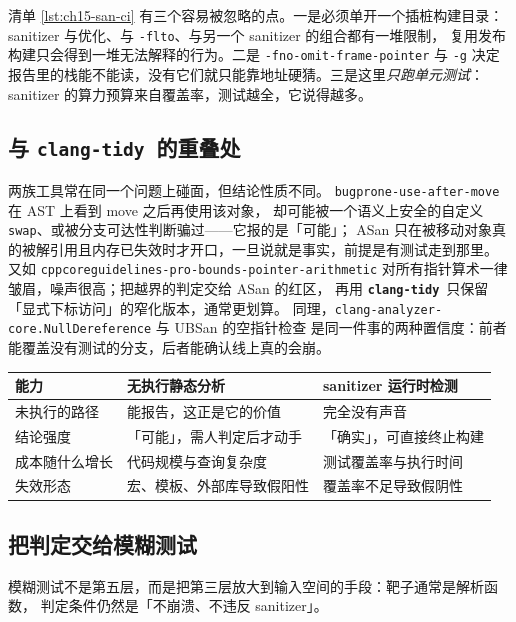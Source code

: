 \documentclass[12pt,a4paper,fontset=fandol]{ctexbook}
\newcommand{\Tp}[1]{\texttt{#1}}
\newcommand{\Lib}[1]{\textbf{\texttt{#1}}}
\newcommand{\Tidy}{\Lib{clang-tidy}}
\begin{document}
清单 \ref{lst:ch15-san-ci} 有三个容易被忽略的点。一是必须单开一个插桩构建目录：
sanitizer 与优化、与 \texttt{-flto}、与另一个 sanitizer 的组合都有一堆限制，
复用发布构建只会得到一堆无法解释的行为。二是 \texttt{-fno-omit-frame-pointer} 与 \texttt{-g}
决定报告里的栈能不能读，没有它们就只能靠地址硬猜。三是这里\emph{只跑单元测试}：
sanitizer 的算力预算来自覆盖率，测试越全，它说得越多。

\subsection*{与 \Tidy\ 的重叠处}

两族工具常在同一个问题上碰面，但结论性质不同。
\texttt{bugprone-use-after-move} 在 AST 上看到 move 之后再使用该对象，
却可能被一个语义上安全的自定义 \Tp{swap}、或被分支可达性判断骗过——它报的是「可能」；
ASan 只在被移动对象真的被解引用且内存已失效时才开口，一旦说就是事实，前提是有测试走到那里。
又如 \texttt{cppcoreguidelines-\allowbreak pro-bounds-pointer-\allowbreak arithmetic}
对所有指针算术一律皱眉，噪声很高；把越界的判定交给 ASan 的红区，
再用 \Tidy\ 只保留「显式下标访问」的窄化版本，通常更划算。
同理，\texttt{clang-analyzer-core.NullDereference} 与 UBSan 的空指针检查
是同一件事的两种置信度：前者能覆盖没有测试的分支，后者能确认线上真的会崩。

\begin{compare}[title={静态与动态：四种能力对照}]
\begin{tabular}{@{}>{\raggedright\arraybackslash}p{}>{\raggedright\arraybackslash}p{}>{\raggedright\arraybackslash}p{}@{}}
\toprule
能力 & 无执行静态分析 & sanitizer 运行时检测 \\
\midrule
未执行的路径 & 能报告，这正是它的价值 & 完全没有声音 \\
结论强度 & 「可能」，需人判定后才动手 & 「确实」，可直接终止构建 \\
成本随什么增长 & 代码规模与查询复杂度 & 测试覆盖率与执行时间 \\
失效形态 & 宏、模板、外部库导致假阳性 & 覆盖率不足导致假阴性 \\
\bottomrule
\end{tabular}
\end{compare}

\subsection*{把判定交给模糊测试}

模糊测试不是第五层，而是把第三层放大到输入空间的手段：靶子通常是解析函数，
判定条件仍然是「不崩溃、不违反 sanitizer」。
\end{document}
